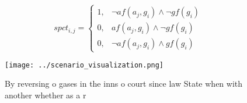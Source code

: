 \documentclass[a4paper]{article}
\begin{document}
\begin{equation}
spct_{i,j} =
\begin{cases}
1, & \text{$\neg af(a_j,g_i) \wedge \neg gf(g_i)$}\\
0, & \text{$af(a_j,g_i) \wedge \neg gf(g_i)$}\\
0, & \text{$\neg af(a_j,g_i) \wedge gf(g_i)$}
\end{cases}
\end{equation}

\begin{figure}
\centering
\texttt{[image: ../scenario\_visualization.png]}
\caption{By reversing o gases in the inns o court since law State when with another whether as a r
}
\end{figure}
 
\end{document}
